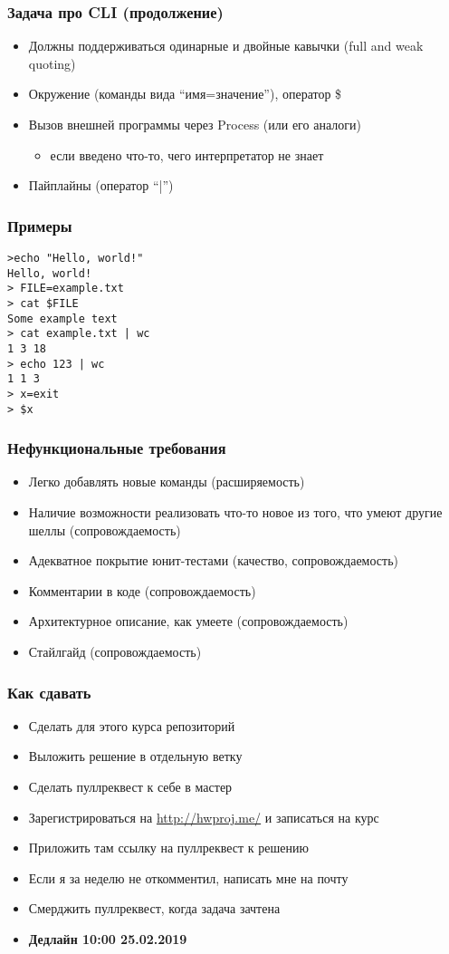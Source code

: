 \documentclass[xetex,mathserif,serif]{beamer}
\begin{document}
	\begin{frame}
		\frametitle{Задача про CLI (продолжение)}
		\begin{itemize}
			\item Должны поддерживаться одинарные и двойные кавычки (full and weak quoting)
			\item Окружение (команды вида ``имя=значение''), оператор \$
			\item Вызов внешней программы через Process (или его аналоги)
			\begin{itemize}
				\item если введено что-то, чего интерпретатор не знает
			\end{itemize}
			\item Пайплайны (оператор ``|'')
		\end{itemize}
	\end{frame}
	
	\begin{frame}[fragile]
		\frametitle{Примеры}
\begin{verbatim}
>echo "Hello, world!"
Hello, world!
> FILE=example.txt
> cat $FILE
Some example text
> cat example.txt | wc
1 3 18
> echo 123 | wc
1 1 3
> x=exit
> $x
\end{verbatim}
\end{frame}

	\begin{frame}
		\frametitle{Нефункциональные требования}
		\begin{itemize}
			\item Легко добавлять новые команды (расширяемость)
			\item Наличие возможности реализовать что-то новое из того, что умеют другие шеллы (сопровождаемость)
			\item Адекватное покрытие юнит-тестами (качество, сопровождаемость)
			\item Комментарии в коде (сопровождаемость)
			\item Архитектурное описание, как умеете (сопровождаемость)
			\item Стайлгайд (сопровождаемость)
		\end{itemize}
	\end{frame}
	
	\begin{frame}
		\frametitle{Как сдавать}
		\begin{itemize}
			\item Сделать для этого курса репозиторий
			\item Выложить решение в отдельную ветку
			\item Сделать пуллреквест к себе в мастер
			\item Зарегистрироваться на \url{http://hwproj.me/} и записаться на курс
			\item Приложить там ссылку на пуллреквест к решению
			\item Если я за неделю не откомментил, написать мне на почту
			\item Смерджить пуллреквест, когда задача зачтена
			\item \textbf{Дедлайн 10:00 25.02.2019}
		\end{itemize}
	\end{frame}
	
\end{document}
